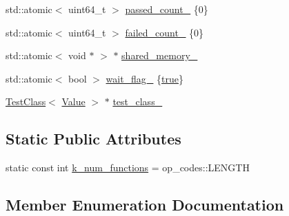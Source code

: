 \begin{DoxyCompactItemize}
\item 
std\+::atomic$<$ uint64\+\_\+t $>$ \hyperlink{class_test_object_a7f2ec3b2d643f50a441e84e3bce407da}{passed\+\_\+count\+\_\+} \{0\}
\item 
std\+::atomic$<$ uint64\+\_\+t $>$ \hyperlink{class_test_object_ac35fa7f931e815c17dc672d2bc157a50}{failed\+\_\+count\+\_\+} \{0\}
\item 
std\+::atomic$<$ void $\ast$ $>$ $\ast$ \hyperlink{class_test_object_a5a0bcec98ef2512f1c62e330522b6df0}{shared\+\_\+memory\+\_\+}
\item 
std\+::atomic$<$ bool $>$ \hyperlink{class_test_object_a6ccfdc908c6a49be86e380474a3448c0}{wait\+\_\+flag\+\_\+} \{\hyperlink{class_test_object_a5837b96611f5cc5dc27a4b536831b489}{true}\}
\item 
\hyperlink{class_test_class}{Test\+Class}$<$ \hyperlink{hash__map_2test_object_8h_ad777bf08d8e2b01df17ba5e3c51ae11f}{Value} $>$ $\ast$ \hyperlink{class_test_object_ab978d0afc9d91e3f0d51b52fe13eafb4}{test\+\_\+class\+\_\+}
\end{DoxyCompactItemize}
\subsection*{Static Public Attributes}
\begin{DoxyCompactItemize}
\item 
static const int \hyperlink{class_test_object_a2eafe110f35fcae7fa739cd52f02392a}{k\+\_\+num\+\_\+functions} = op\+\_\+codes\+::\+L\+E\+N\+G\+T\+H
\end{DoxyCompactItemize}


\subsection{Member Enumeration Documentation}
\hypertarget{class_test_object_a2748dcd7cc312f5a3d52ad94a3400691}{}
